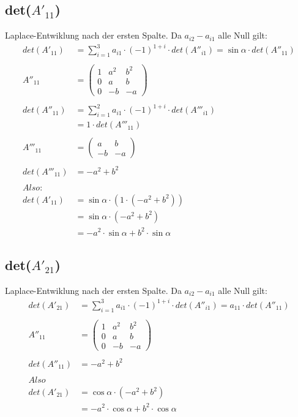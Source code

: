 \documentclass{article} %
\begin{document}
\subsection*{det($A'_{11}$)}
Laplace-Entwiklung nach der ersten Spalte. Da $a_{i2} - a_{i1}$ alle Null gilt: 
\begin{align*}
 det(A'_{11}) & = \sum^3_{i =1} a_{i1} \cdot (-1)^{1+i} \cdot det(A''_{i1})  = \sin \alpha \cdot det(A''_{11})  \\ \\
A''_{11} &  = \begin{pmatrix}
1 & a^2 & b^2 \\
 0 & a & b \\
 0 & -b & -a
\end{pmatrix} \\ \\
    det(A''_{11})  & =  \sum^2_{i =1} a_{i1} \cdot (-1)^{1+i} \cdot det(A'''_{i1})  \\
    & =  1 \cdot det(A'''_{11})  \\ \\
    A'''_{11}  & = \begin{pmatrix}
  a & b \\
  -b & -a
\end{pmatrix} \\ \\
det( A'''_{11}) & = -a^2 + b^2 \\ \\
Also: & \\
 det(A'_{11}) & = \sin \alpha \cdot (1 \cdot (-a^2 + b^2))  \\
 & = \sin \alpha \cdot(-a^2 + b^2) \\
 & = -a^2 \cdot \sin \alpha  + b^2 \cdot \sin \alpha
\end{align*}

\subsection*{det($A'_{21}$)}
Laplace-Entwiklung nach der ersten Spalte. Da $a_{i2} - a_{i1}$ alle Null gilt: 
\begin{align*}
     det(A'_{21}) & = \sum^3_{i =1} a_{i1} \cdot (-1)^{1+i} \cdot det(A''_{i1})  = a_{11} \cdot det(A''_{11})  \\ \\
     A''_{11} &  = \begin{pmatrix}
1 & a^2 & b^2 \\
 0 & a & b \\
 0 & -b & -a
\end{pmatrix} \\ \\
det(A''_{11})  & = -a^2 + b^2 \\ \\
Also \\
 det(A'_{21}) & = \cos \alpha \cdot(-a^2 + b^2) \\
 & = -a^2 \cdot \cos \alpha  + b^2 \cdot \cos \alpha 
\end{align*}
\end{document}
